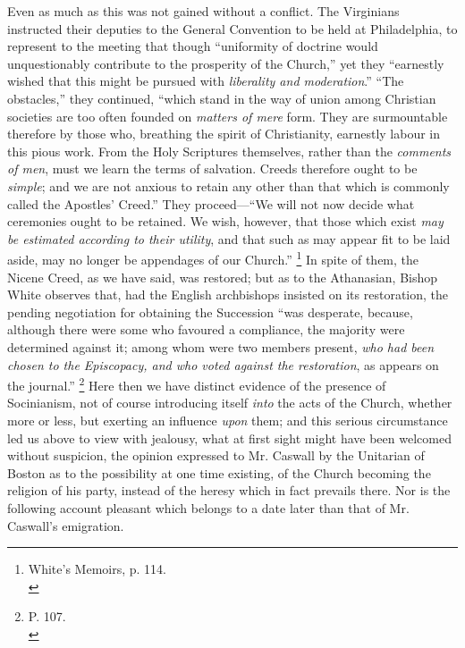 Even as much as this was not gained without a
conflict. The Virginians instructed their deputies to the General
Convention to be held at Philadelphia, to represent to the meeting
that though ``uniformity of doctrine would unquestionably contribute to
the prosperity of the Church,'' yet they ``earnestly wished that this
might be pursued with \emph{liberality and moderation}.'' ``The
obstacles,'' they continued, ``which stand in the way of union among
Christian societies are too often founded on \emph{matters of mere}
form. They are surmountable therefore by those who, breathing the
spirit of Christianity, earnestly labour in this pious work. From the
Holy Scriptures themselves, rather than the \emph{comments of men},
must we learn the terms of salvation. Creeds therefore ought to be \emph{simple};
and we are not anxious to retain any other than that which is
commonly called the Apostles' Creed.'' They proceed—``We will not now
decide what ceremonies ought to be retained. We wish, however, that
those which exist \emph{may be estimated according to their utility},
and that such as may appear fit to be laid aside, may no longer be
appendages of our Church.'' \footnote{White's Memoirs, p. 114.\textbf{}\\}
In spite of them, the Nicene Creed, as we have said, was restored; but
as to the Athanasian, Bishop White observes that, had the English
archbishops insisted on its restoration, the pending negotiation for
obtaining the Succession ``was desperate, because, although there were
some who favoured a compliance, the majority were determined against
it; among whom were two members present, \emph{who had been chosen to the
Episcopacy, and who voted against the restoration}, as appears on
the journal.'' \footnote{P. 107.\textbf{}\\} Here then
we have distinct evidence of the presence of Socinianism, not of
course introducing itself \emph{into} the acts of the Church, whether
more or less, but exerting an influence \emph{upon} them; and this
serious circumstance led us above to view with jealousy, what at first
sight might have been welcomed without suspicion, the opinion
expressed to Mr. Caswall by the Unitarian of Boston as to the
possibility at one time existing, of the Church becoming the religion
of his party, instead of the heresy which in fact prevails there. Nor
is the following account pleasant which belongs to a date later than
that of Mr. Caswall's emigration.

